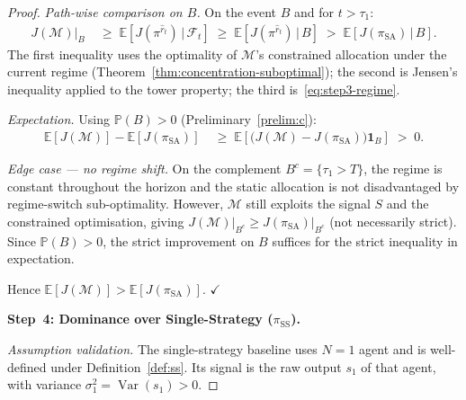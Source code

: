 \documentclass[12pt,openany]{book}
\newcommand{\E}{\mathbb{E}}
\numberwithin{equation}{chapter}
\theoremstyle{plain}
\theoremstyle{definition}
\theoremstyle{remark}
\numberwithin{equation}{chapter}
\theoremstyle{plain}
\DeclareMathOperator{\Var}{Var}
\begin{document}
\begin{proof}
\medskip
\noindent\textit{Path-wise comparison on $B$.}
On the event $B$ and for $t > \tau_1$:
\begin{align}
  J(\mathcal{M})\big|_{B}
  &\;\ge\;
  \E\!\left[J(\pi^{\hat{r}_t})\,\big|\,\mathcal{F}_t\right]
  \;\ge\;
  \E\!\left[J(\pi^{\hat{r}_t})\,\big|\,B\right]
  \;>\;
  \E\!\left[J(\pi_{\mathrm{SA}})\,\big|\,B\right].
  \label{eq:step3-chain}
\end{align}
The first inequality uses the optimality of $\mathcal{M}$'s
constrained allocation under the current regime (Theorem~\ref{thm:concentration-suboptimal}); the second is Jensen's inequality applied
to the tower property; the third is~\eqref{eq:step3-regime}.

\medskip
\noindent\textit{Expectation.}
Using $\mathbb{P}(B) > 0$ (Preliminary~\ref{prelim:c}):
\begin{align}
  \E[J(\mathcal{M})] - \E[J(\pi_{\mathrm{SA}})]
  &\;\ge\;
  \E\!\left[\bigl(J(\mathcal{M}) - J(\pi_{\mathrm{SA}})\bigr)
    \mathbf{1}_B\right]
  \;>\; 0.
  \label{eq:step3-exp}
\end{align}

\medskip
\noindent\textit{Edge case — no regime shift.}
On the complement $B^c = \{\tau_1 > T\}$, the regime is constant
throughout the horizon and the static allocation is not disadvantaged
by regime-switch sub-optimality.  However, $\mathcal{M}$ still exploits
the signal $S$ and the constrained optimisation, giving
$J(\mathcal{M})\big|_{B^c} \ge J(\pi_{\mathrm{SA}})\big|_{B^c}$
(not necessarily strict).  Since $\mathbb{P}(B) > 0$, the strict
improvement on $B$ suffices for the strict inequality in expectation.

\medskip
Hence $\E[J(\mathcal{M})] > \E[J(\pi_{\mathrm{SA}})]$. \hfill$\checkmark$

\bigskip
\noindent\textbf{Step~4: Dominance over Single-Strategy
($\pi_{\mathrm{SS}}$).}

\medskip
\noindent\textit{Assumption validation.}
The single-strategy baseline uses $N = 1$ agent and is well-defined
under Definition~\ref{def:ss}.  Its signal is the raw output
$s_1$ of that agent, with variance $\sigma_1^2 = \Var(s_1) > 0$.


\end{proof}
\end{document}

